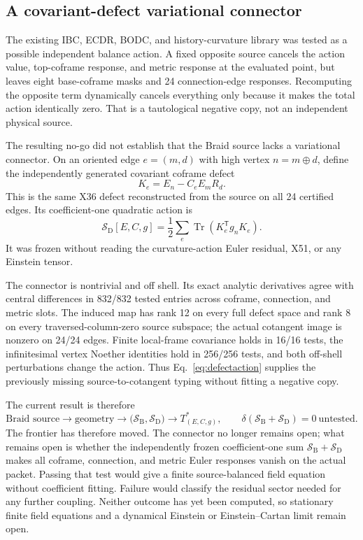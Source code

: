 \documentclass[11pt]{article}
\theoremstyle{definition}
\theoremstyle{remark}
\newcommand{\Tr}{\operatorname{Tr}}
\begin{document}
\subsection{A covariant-defect variational connector}

The existing IBC, ECDR, BODC, and history-curvature library was tested as a possible independent balance action. A fixed opposite source cancels the action value, top-coframe response, and metric response at the evaluated point, but leaves eight base-coframe masks and 24 connection-edge responses. Recomputing the opposite term dynamically cancels everything only because it makes the total action identically zero. That is a tautological negative copy, not an independent physical source.

The resulting no-go did not establish that the Braid source lacks a variational connector. On an oriented edge $e=(m,d)$ with high vertex $n=m\oplus d$, define the independently generated covariant coframe defect
\begin{equation}\label{eq:defectconnector}
 K_e=E_n-C_eE_mR_d.
\end{equation}
This is the same X36 defect reconstructed from the source on all 24 certified edges. Its coefficient-one quadratic action is
\begin{equation}\label{eq:defectaction}
 \mathcal S_{\mathrm D}[E,C,g]
 =\frac12\sum_e\Tr\!\left(K_e^{\mathsf T}g_nK_e\right).
\end{equation}
It was frozen without reading the curvature-action Euler residual, X51, or any Einstein tensor.

The connector is nontrivial and off shell. Its exact analytic derivatives agree with central differences in 832/832 tested entries across coframe, connection, and metric slots. The induced map has rank 12 on every full defect space and rank 8 on every traversed-column-zero source subspace; the actual cotangent image is nonzero on 24/24 edges. Finite local-frame covariance holds in 16/16 tests, the infinitesimal vertex Noether identities hold in 256/256 tests, and both off-shell perturbations change the action. Thus Eq.~\eqref{eq:defectaction} supplies the previously missing source-to-cotangent typing without fitting a negative copy.

The current result is therefore
\begin{equation}\label{eq:frontier}
 \boxed{
 \text{Braid source}\to\text{geometry}
 \to\bigl(\mathcal S_{\mathrm B},\mathcal S_{\mathrm D}\bigr)
 \to T^*_{(E,C,g)},
 \qquad
 \delta\!\left(\mathcal S_{\mathrm B}+\mathcal S_{\mathrm D}\right)=0
 \ \text{untested}.}
\end{equation}
The frontier has therefore moved. The connector no longer remains open; what remains open is whether the independently frozen coefficient-one sum $\mathcal S_{\mathrm B}+\mathcal S_{\mathrm D}$ makes all coframe, connection, and metric Euler responses vanish on the actual packet. Passing that test would give a finite source-balanced field equation without coefficient fitting. Failure would classify the residual sector needed for any further coupling. Neither outcome has yet been computed, so stationary finite field equations and a dynamical Einstein or Einstein--Cartan limit remain open.
\end{document}
